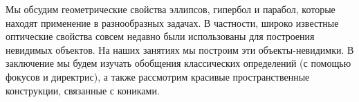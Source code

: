 



Мы обсудим геометрические свойства эллипсов, гипербол и парабол, которые
находят применение в разнообразных задачах.
В частности, широко известные оптические свойства совсем недавно были
использованы для построения невидимых объектов.
На наших занятиях мы построим эти объекты-невидимки.
В заключение мы будем изучать обобщения классических определений (с помощью
фокусов и директрис), а также рассмотрим красивые пространственные конструкции,
связанные с кониками.

